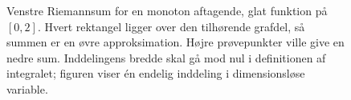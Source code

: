 \begin{figure}[htbp]
\centering
{}
\caption{Venstre Riemannsum for en monoton aftagende, glat funktion på
$[0,2]$. Hvert rektangel ligger over den tilhørende grafdel, så summen er
en øvre approksimation. Højre prøvepunkter ville give en nedre sum.
Inddelingens bredde skal gå mod nul i definitionen af integralet;
figuren viser én endelig inddeling i dimensionsløse variable.}
\label{fig:integral-riemann}
\end{figure}
